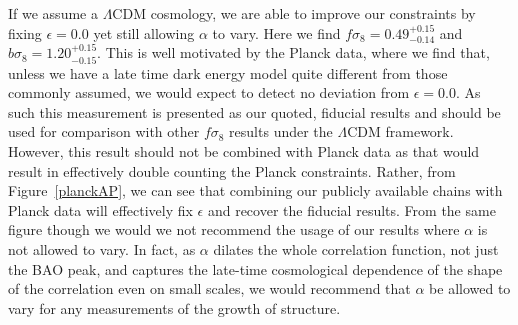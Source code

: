 If we assume a $\Lambda$CDM cosmology, we are able to improve our constraints by fixing $\epsilon=0.0$ yet still allowing $\alpha$ to vary. Here we find $f\sigma_{8}=0.49^{+0.15}_{-0.14}$ and  $b\sigma_{8}=1.20^{+0.15}_{-0.15}$. This is well motivated by the Planck data, where we find that, unless we have a late time dark energy model quite different from those commonly assumed, we would expect to detect no deviation from $\epsilon=0.0$. As such this measurement is presented as our quoted, fiducial results and should be used for comparison with other $f\sigma_{8}$ results under the $\Lambda$CDM framework. However, this result should not be combined with Planck data as that would result in effectively double counting the Planck constraints. Rather, from Figure~\ref{planckAP}, we can see that combining our publicly available chains with Planck data will effectively fix $\epsilon$ and recover the fiducial results. From the same figure though we would we not recommend the usage of our results where $\alpha$ is not allowed to vary. In fact, as $\alpha$ dilates the whole correlation function, not just the BAO peak, and captures the late-time cosmological dependence of the shape of the correlation even on small scales, we would recommend that $\alpha$ be allowed to vary for any measurements of the growth of structure.
